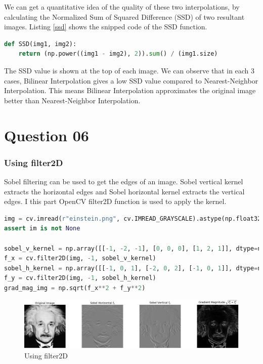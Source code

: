\documentclass[a4paper]{article}
\begin{document}
We can get a quantitative idea of the quality of these two interpolations,
 by calculating the Normalized Sum of Squared Difference (SSD) of two
  resultant images. Listing \ref{ssd} shows the snipped code of the SSD
   function.
\begin{lstlisting}[language=python, caption=SSD, label=ssd]
def SSD(img1, img2):
    return (np.power((img1 - img2), 2)).sum() / (img1.size)
\end{lstlisting}
The SSD value is shown at the top of each image. We can observe that
 in each 3 cases, Bilinear Interpolation gives a low SSD value compared
  to Nearest-Neighbor Interpolation. This means Bilinear Interpolation
   approximates the original image better than Nearest-Neighbor
    Interpolation.


\section*{Question 06}
\subsubsection*{Using filter2D}
Sobel filtering can be used to get the edges of an image. Sobel
 vertical kernel extracts the horizontal edges and Sobel horizontal
  kernel extracts the vertical edges. I this part OpenCV filter2D
   function is used to apply the kernel.
\begin{lstlisting}[language=python]
img = cv.imread(r"einstein.png", cv.IMREAD_GRAYSCALE).astype(np.float32)
assert im is not None

sobel_v_kernel = np.array([[-1, -2, -1], [0, 0, 0], [1, 2, 1]], dtype=np.float32)
f_x = cv.filter2D(img, -1, sobel_v_kernel)
sobel_h_kernel = np.array([[-1, 0, 1], [-2, 0, 2], [-1, 0, 1]], dtype=np.float32)
f_y = cv.filter2D(img, -1, sobel_h_kernel)
grad_mag_img = np.sqrt(f_x**2 + f_y**2)
\end{lstlisting}
\begin{figure}[!htb]
    \centering
    \includegraphics[width=\textwidth]{../q61.png}
    \caption{Using filter2D}
    \label{fig61}
\end{figure}
\end{document}
